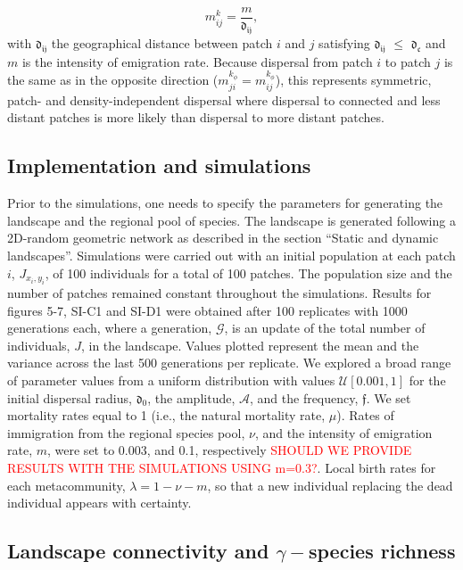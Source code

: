 \documentclass[12pt]{article}
\newcommand{\carlos}[1]{\textcolor{Red}{#1}}
\begin{document}
\begin{equation}
  m_{ij}^{k} =  \frac{m}{\mathfrak{d_{ij}}},
\label{neutdis}
\end{equation}
with $\mathfrak{d_{ij}}$ the geographical distance between patch $i$
and $j$ satisfying $\mathfrak{d_{ij}}$ $\leq$ $\mathfrak{d_{c}}$ and
$m$ is the intensity of emigration rate. Because dispersal from patch
$i$ to patch $j$ is the same as in the opposite direction
($m_{ji}^{k_{\phi}} = m_{ij}^{k_{\phi}}$), this represents symmetric, patch- and density-independent dispersal where dispersal to connected and less distant patches is more likely than dispersal to more
distant patches.

\subsection*{Implementation and simulations}

Prior to the simulations, one needs to specify the parameters for generating the landscape and the regional pool of species. The landscape is generated following a 2D-random geometric network as
described in the section ``Static and dynamic landscapes''. Simulations were carried out with an initial population at each patch $i$, $J_{x_i,y_i}$, of 100 individuals for a total of 100 patches. The population size and the number of patches remained constant throughout the simulations. Results for figures 5-7, SI-C1 and SI-D1 were obtained after 100 replicates with 1000 generations each, where a generation, $\mathcal{G}$, is an update of the total number of individuals, $J$, in the landscape. Values plotted represent the mean and the variance across the last 500 generations per replicate. We explored a broad range of parameter values from a uniform distribution with values $\mathcal{U}[0.001,1]$ for the initial dispersal radius, $\mathfrak{d_{0}}$, the amplitude,
$\mathcal{A}$, and the frequency, $\mathfrak{f}$. We set mortality rates equal to 1 (i.e., the natural mortality rate, $\mu$). Rates of immigration from the regional species pool, $\nu$, and the intensity
of emigration rate, $m$, were set to 0.003, and 0.1, respectively \carlos{SHOULD WE PROVIDE RESULTS WITH THE SIMULATIONS USING m=0.3?}. Local birth rates for each metacommunity, $\lambda = 1 - \nu - m$, so that a new individual replacing the dead individual appears with certainty.

\subsection*{Landscape connectivity and $\gamma-$species richness}
\end{document}
